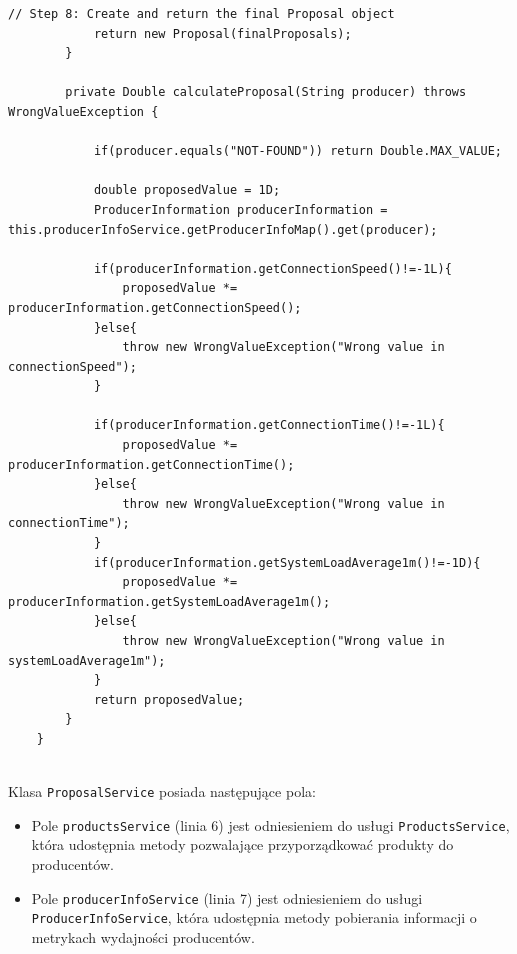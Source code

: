 \begin{lstlisting}[caption=Kod klasy ProposalService, label=ProposalServiceCode]
            // Step 8: Create and return the final Proposal object
            return new Proposal(finalProposals);
        }
    
        private Double calculateProposal(String producer) throws WrongValueException {
    
            if(producer.equals("NOT-FOUND")) return Double.MAX_VALUE;
    
            double proposedValue = 1D;
            ProducerInformation producerInformation = this.producerInfoService.getProducerInfoMap().get(producer);
    
            if(producerInformation.getConnectionSpeed()!=-1L){
                proposedValue *= producerInformation.getConnectionSpeed();
            }else{
                throw new WrongValueException("Wrong value in connectionSpeed");
            }
            
            if(producerInformation.getConnectionTime()!=-1L){
                proposedValue *= producerInformation.getConnectionTime();
            }else{
                throw new WrongValueException("Wrong value in connectionTime");
            }
            if(producerInformation.getSystemLoadAverage1m()!=-1D){
                proposedValue *= producerInformation.getSystemLoadAverage1m();
            }else{
                throw new WrongValueException("Wrong value in systemLoadAverage1m");
            }
            return proposedValue;
        }
    }
    
\end{lstlisting}


Klasa \verb|ProposalService| posiada następujące pola:
\begin{itemize}
    \item Pole \verb|productsService| (linia 6) jest odniesieniem do usługi \verb|ProductsService|, która udostępnia metody pozwalające przyporządkować produkty do producentów.
    \item Pole \verb|producerInfoService| (linia 7) jest odniesieniem do usługi \verb|ProducerInfoService|, która udostępnia metody pobierania informacji o metrykach wydajności producentów.
\end{itemize}

